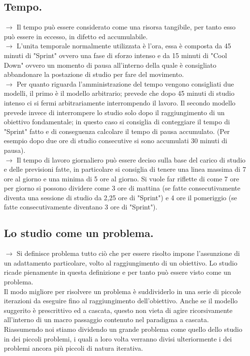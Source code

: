 \documentclass[11pt,a4paper]{article}
\begin{document}
\subsection{Tempo.}
$\rightarrow$ Il tempo può essere considerato come una risorsa tangibile, per tanto esso può essere in eccesso, in difetto ed accumulabile.\\
$\rightarrow$ L'unita temporale normalmente utilizzata è l'ora, essa è composta da 45 minuti di "Sprint" ovvero una fase di sforzo intenso e da 15 minuti di "Cool Down" ovvero un momento di pausa all'interno della quale è consigliato abbandonare la postazione di studio per fare del movimento. \\
$\rightarrow$ Per quanto riguarda l'amministrazione del tempo vengono consigliati due modelli, il primo è il  modello arbitrario; prevede che dopo 45 minuti di studio intenso ci si fermi arbitrariamente interrompendo il lavoro. Il secondo modello prevede invece di interrompere lo studio solo dopo il raggiungimento di un obiettivo fondamentale; in questo caso si consiglia di conteggiare il tempo di "Sprint" fatto e di conseguenza calcolare il tempo di pausa accumulato. (Per esempio dopo due ore di studio consecutive si sono accumulati 30 minuti di pausa).\\
$\rightarrow$ Il tempo di lavoro giornaliero può essere deciso sulla base del carico di studio e delle previsioni fatte, in particolare si consiglia di tenere una linea massima di 7 ore al giorno e una minima di 5 ore al giorno. Si vuole far riflette di come 7 ore per giorno si possono dividere come 3 ore di mattina (se fatte consecutivamente diventa una sessione di studio da 2,25 ore di "Sprint") e 4 ore il pomeriggio (se fatte consecutivamente diventano 3 ore di "Sprint").\\

\subsection{Lo studio come un problema.} 
$\rightarrow$ Si definisce problema tutto ciò che per essere risolto impone l'assunzione di un adattamento particolare, volto al raggiungimento di un obiettivo. Lo studio ricade pienamente in questa definizione e per tanto può essere visto come un problema.\\
Il modo migliore per risolvere un problema è suddividerlo in una serie di piccole iterazioni da eseguire fino al raggiungimento dell'obiettivo. Anche se il modello suggerito è prescrittivo ed a cascata, questo non vieta di agire ricorsivamente all'interno di un macro passaggio contenuto nel paradigma a cascata.\\
Riassumendo noi stiamo dividendo un grande problema come quello dello studio in dei piccoli problemi, i quali a loro volta verranno divisi ulteriormente i dei problemi ancora più piccoli di natura iterativa.\\ 
\end{document}
